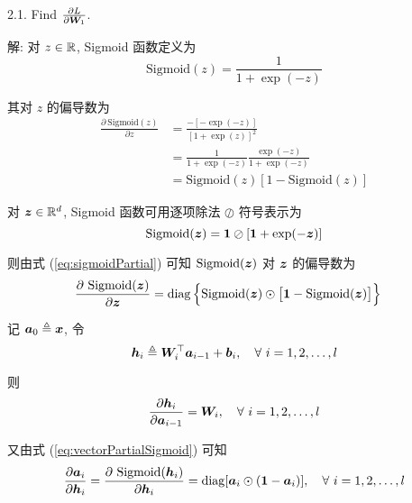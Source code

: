 \documentclass{article}
\begin{document}
2.1. Find $\frac{\partial L}{\partial \bm{W}_1}$.

解: 对 $z\in\mathbb{R}$, Sigmoid 函数定义为
\begin{equation}
  \mathrm{Sigmoid}(z)=\frac{1}{1+\exp(-z)}
\end{equation}

其对 $z$ 的偏导数为
\begin{equation}
  \begin{aligned}
    \frac{\partial~\mathrm{Sigmoid}(z)}{\partial z}
    &=\frac{-[-\exp(-z)]}{[1+\exp(z)]^2}\\
    &=\frac{1}{1+\exp(-z)}\frac{\exp(-z)}{1+\exp(-z)}\\
    &=\mathrm{Sigmoid}(z)[1-\mathrm{Sigmoid}(z)]
  \end{aligned}
  \label{eq:sigmoidPartial}
\end{equation}

对 $\bm{z}\in\mathbb{R}^d$, Sigmoid 函数可用逐项除法 $\oslash$ 符号表示为
\begin{equation}
  \mathrm{Sigmoid}(\bm{z})=\bm{1}\oslash[\bm{1}+\exp(-\bm{z})]
\end{equation}

则由式 (\ref{eq:sigmoidPartial}) 可知 $\mathrm{Sigmoid}(\bm{z})$ 对 $\bm{z}$ 的偏导数为
\begin{equation}
  \begin{aligned}
    \frac{\partial~\mathrm{Sigmoid}(\bm{z})}{\partial\bm{z}}
    &=\operatorname{diag}\Big\{\mathrm{Sigmoid}(\bm{z})\odot\big[\bm{1}-\mathrm{Sigmoid}(\bm{z})\big]\Big\}
  \end{aligned}
  \label{eq:vectorPartialSigmoid}
\end{equation}

记 $\bm{a}_0\triangleq\bm{x}$, 令
\begin{equation}
  \bm{h}_i\triangleq\bm{W}_i^\top\bm{a}_{i-1}+\bm{b}_i,\quad\forall~i=1,2,\dots,l
\end{equation}

则
\begin{equation}
  \frac{\partial\bm{h}_i}{\partial\bm{a}_{i-1}}=\bm{W}_i,\quad\forall~i=1,2,\dots,l
\end{equation}

又由式 (\ref{eq:vectorPartialSigmoid}) 可知
\begin{equation}
  \frac{\partial\bm{a}_i}{\partial\bm{h}_i}=\frac{\partial~\mathrm{Sigmoid}(\bm{h}_i)}{\partial\bm{h}_i}=\operatorname{diag}[\bm{a}_i\odot(\bm{1}-\bm{a}_i)],\quad\forall~i=1,2,\dots,l
\end{equation}
\end{document}
